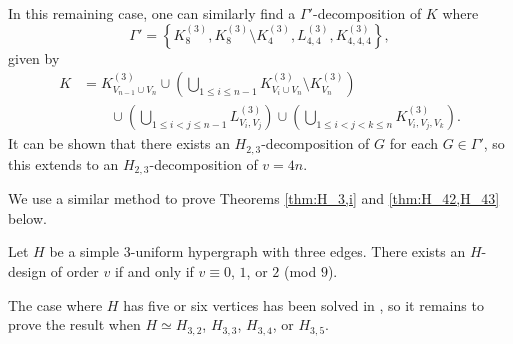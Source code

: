 In this remaining case, one can similarly find a $\Gamma'$-decomposition of $K$ where
\[
    \Gamma' = \left\{ K_{8}^{(3)}, K_{8}^{(3)} \setminus K_{4}^{(3)}, L_{4,4}^{(3)}, K_{4,4,4}^{(3)} \right\},
\]
given by
\begin{align*}
    K &= K_{V_{n-1} \cup V_n}^{(3)}
    \cup \left( \bigcup_{1 \leq i \leq n-1} K_{V_i \cup V_n}^{(3)} \setminus K_{V_n}^{(3)} \right) \\
    & \quad \quad \cup \left( \bigcup_{1 \leq i < j \leq n-1} L_{V_i, V_j}^{(3)} \right)
    \cup \left( \bigcup_{1 \leq i < j < k \leq n} K_{V_i, V_j, V_k}^{(3)} \right).
\end{align*}
It can be shown that there exists an $H_{2,3}$-decomposition of $G$ for each $G \in \Gamma'$, so this extends to
an $H_{2,3}$-decomposition of $v = 4n$.

We use a similar method to prove Theorems \ref{thm:H_3,i} and \ref{thm:H_42,H_43} below.

\begin{theorem} \label{thm:H_3,i}
Let $H$ be a simple $3$-uniform hypergraph with three edges.
There exists an $H$-design of order $v$ if and only if $v \equiv 0$, $1$, or $2$ (mod $9$).
\end{theorem}

The case where $H$ has five or six vertices has been solved in \cite{bryant},
so it remains to prove the result when $H \simeq H_{3,2}$, $H_{3,3}$, $H_{3,4}$, or $H_{3,5}$.

